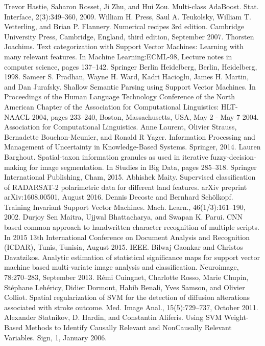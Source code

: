 \documentclass[preprint,12pt]{elsarticle}
\begin{document}
\begin{thebibliography}{000}
 Trevor Hastie, Saharon Rosset, Ji Zhu, and Hui Zou. Multi-class AdaBoost. Stat. Interface, 2(3):349–360, 2009. 
 William H. Press, Saul A. Teukolsky, William T. Vetterling, and Brian P. Flannery. Numerical recipes 3rd edition. Cambridge University Press, Cambridge, England, third edition, September 2007. 
 Thorsten Joachims. Text categorization with Support Vector Machines: Learning with many relevant features. In Machine Learning:ECML-98, Lecture notes in computer science, pages 137–142. Springer Berlin Heidelberg, Berlin, Heidelberg, 1998. 
 Sameer S. Pradhan, Wayne H. Ward, Kadri Hacioglu, James H. Martin, and Dan Jurafsky. Shallow Semantic Parsing using Support Vector Machines. In Proceedings of the Human Language Technology Conference of the North American Chapter of the Association for Computational Linguistics: HLT-NAACL 2004, pages 233–240, Boston, Massachusetts, USA, May 2 - May 7 2004. Association for Computational Linguistics. 
 Anne Laurent, Olivier Strauss, Bernadette Bouchon-Meunier, and Ronald R Yager. Information Processing and Management of Uncertainty in Knowledge-Based Systems. Springer, 2014. 
 Lauren Barghout. Spatial-taxon information granules as used in iterative fuzzy-decision-making for image segmentation. In Studies in Big Data, pages 285–318. Springer International Publishing, Cham, 2015. 
 Abhishek Maity. Supervised classification of RADARSAT-2 polarimetric data for different land features. arXiv preprint arXiv:1608.00501, August 2016. 
 Dennis Decoste and Bernhard Schölkopf. Training Invariant Support Vector Machines. Mach. Learn., 46(1/3):161–190, 2002. 
 Durjoy Sen Maitra, Ujjwal Bhattacharya, and Swapan K. Parui. CNN based common approach to handwritten character recognition of multiple scripts. In 2015 13th International Conference on Document Analysis and Recognition (ICDAR), Tunis, Tunisia, August 2015. IEEE. 
 Bilwaj Gaonkar and Christos Davatzikos. Analytic estimation of statistical significance maps for support vector machine based multi-variate image analysis and classification. Neuroimage, 78:270–283, September 2013. 
 Rémi Cuingnet, Charlotte Rosso, Marie Chupin, Stéphane Lehéricy, Didier Dormont, Habib Benali, Yves Samson, and Olivier Colliot. Spatial regularization of SVM for the detection of diffusion alterations associated with stroke outcome. Med. Image Anal., 15(5):729–737, October 2011. 
 Alexander Statnikov, D. Hardin, and Constantin Aliferis. Using SVM Weight-Based Methods to Identify Causally Relevant and NonCausally Relevant Variables. Sign, 1, January 2006. 

\end{thebibliography}
\end{document}
